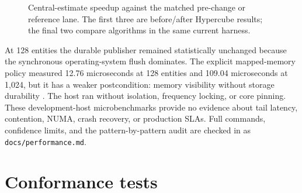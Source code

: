 \documentclass{strategynet-journal}
\begin{document}
\begin{figure}[H]
\centering
{}
\caption{Central-estimate speedup against the matched pre-change or reference
lane.  The first three are before/after Hypercube results; the final two compare
algorithms in the same current harness.}
\label{fig:performance-speedup}
\end{figure}

At 128 entities the durable publisher remained statistically unchanged because
the synchronous operating-system flush dominates.  The explicit mapped-memory
policy measured 12.76 microseconds at 128 entities and 109.04 microseconds at
1,024, but it has a weaker postcondition: memory visibility without storage
durability \cite{memmapflush}.  The host ran without isolation, frequency
locking, or core pinning.  These development-host microbenchmarks provide no
evidence about tail latency, contention, NUMA, crash recovery, or production SLAs.  Full
commands, confidence limits, and the pattern-by-pattern audit are checked in as
\texttt{docs/performance.md}.

\section{Conformance tests}
\end{document}
